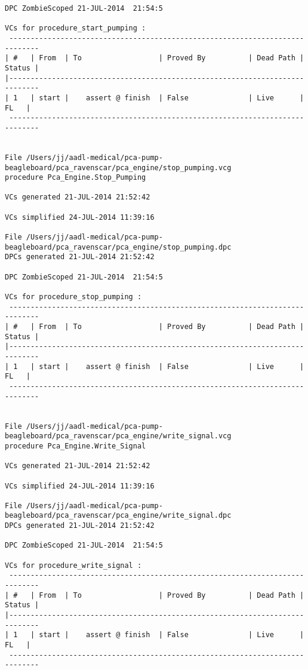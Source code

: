 \begin{lstlisting}[frame=single, gobble=0, caption={POGS report for PCA Pump prototype}]
DPC ZombieScoped 21-JUL-2014  21:54:5

VCs for procedure_start_pumping :
 -----------------------------------------------------------------------------
| #   | From  | To                  | Proved By          | Dead Path | Status |
|-----------------------------------------------------------------------------
| 1   | start |    assert @ finish  | False              | Live      |   FL   |
 -----------------------------------------------------------------------------


File /Users/jj/aadl-medical/pca-pump-beagleboard/pca_ravenscar/pca_engine/stop_pumping.vcg
procedure Pca_Engine.Stop_Pumping

VCs generated 21-JUL-2014 21:52:42

VCs simplified 24-JUL-2014 11:39:16

File /Users/jj/aadl-medical/pca-pump-beagleboard/pca_ravenscar/pca_engine/stop_pumping.dpc
DPCs generated 21-JUL-2014 21:52:42

DPC ZombieScoped 21-JUL-2014  21:54:5

VCs for procedure_stop_pumping :
 -----------------------------------------------------------------------------
| #   | From  | To                  | Proved By          | Dead Path | Status |
|-----------------------------------------------------------------------------
| 1   | start |    assert @ finish  | False              | Live      |   FL   |
 -----------------------------------------------------------------------------


File /Users/jj/aadl-medical/pca-pump-beagleboard/pca_ravenscar/pca_engine/write_signal.vcg
procedure Pca_Engine.Write_Signal

VCs generated 21-JUL-2014 21:52:42

VCs simplified 24-JUL-2014 11:39:16

File /Users/jj/aadl-medical/pca-pump-beagleboard/pca_ravenscar/pca_engine/write_signal.dpc
DPCs generated 21-JUL-2014 21:52:42

DPC ZombieScoped 21-JUL-2014  21:54:5

VCs for procedure_write_signal :
 -----------------------------------------------------------------------------
| #   | From  | To                  | Proved By          | Dead Path | Status |
|-----------------------------------------------------------------------------
| 1   | start |    assert @ finish  | False              | Live      |   FL   |
 -----------------------------------------------------------------------------



\end{lstlisting}
